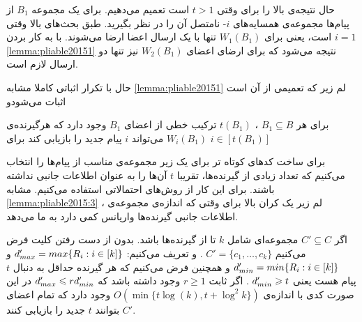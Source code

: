 حال نتیجه‌ی بالا را برای 
وقتی
$t > 1$
است تعمیم می‌دهیم. برای یک مجموعه
$B_1$
از پیام‌ها مجموعه‌ی همسایه‌های
$i$-
نامتصل آن را در نظر بگیرید. طبق بحث‌های بالا وقتی
$i = 1$
است، یعنی برای
$W_1(B_1)$
تنها با یک ارسال اعضا ارضا می‌شوند. با به کار بردن
\autoref{lemma:pliable20151}
نتیجه می‌شود که برای ارضای اعضای
$W_2(B_1)$
نیز تنها دو ارسال لازم است.

\begin{example}
	
\end{example}
حال با تکرار اثباتی کاملا مشابه
\autoref{lemma:pliable20151}
لم زیر که تعمیمی از آن است اثبات می‌شودو
\begin{lemma}
	برای هر
	$B_1 \subseteq B$
	، 
	$t(B_1)$
	ترکیب خطی از اعضای
	$B_1$
	وجود دارد که هرگیرنده‌ی
	$W_i(B_1)$
	می‌تواند
	$i$
	پیام جدید را بازیابی کند برای
	$i \in [t(B_1)]$
\end{lemma}
برای ساخت کدهای کوتاه تر برای
یک زیر مجموعه‌ی مناسب از پیام‌ها را انتخاب می‌کنیم که تعداد زیادی از گیرنده‌ها، تقریبا
$t$
آن‌ها را به عنوان اطلاعات جانبی نداشته باشند. برای این کار از روش‌های احتمالاتی استفاده می‌کنیم. مشابه
\autoref{lemma:pliable2015:3}
، لم زیر یک کران بالا برای وقتی که اندازه‌ی مجموعه‌ی اطلاعات جانبی گیرنده‌ها واریانس کمی دارد به ما می‌دهد.
\begin{lemma}
	\label{lemma:pliable2015:6}
	اگر
	$C' \subseteq C$
	مجموعه‌ای شامل 
	$k$
	تا از گیرنده‌‌ها باشد. بدون از دست رفتن کلیت فرض می‌کنیم
	$C' = \{c_1, \ldots, c_k\}$
	. و تعریف می‌کنیم:
	$d_{max}' = max\{R_i: i \in [k] \}$
	و
	$d_{min}' = min\{R_i: i \in [k] \}$
	و همچنین فرض می‌کنیم که هر گیرنده حداقل به دنبال 
	$t$
	پیام هست یعنی
	$d_{min}' \geqslant t$
	. اگر ثابت
	$r \geq 1$
	وجود داشته باشد که
	$d_{max}' \leqslant r d_{min}'$
	در این صورت کدی با اندازه‌ی
	$O(\min\{t \log(k), t + \log^2 k\})$
	وجود دارد که تمام اعضای
	$C'$
	بتوانند
	$t$
	جدید را بازیابی کنند.
\end{lemma}
